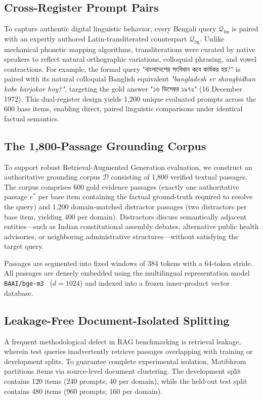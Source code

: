 \subsection{Cross-Register Prompt Pairs}
To capture authentic digital linguistic behavior, every Bengali query $\mathcal{Q}_{\text{bn}}$ is paired with an expertly authored Latin-transliterated counterpart $\mathcal{Q}_{\text{bg}}$. Unlike mechanical phonetic mapping algorithms, transliterations were curated by native speakers to reflect natural orthographic variations, colloquial phrasing, and vowel contractions. For example, the formal query \foreignlanguage{bengali}{"বাংলাদেশের সংবিধান কবে কার্যকর হয়?"} is paired with its natural colloquial Banglish equivalent \emph{"bangladesh er shongbidhan kobe karjokor hoy?"}, targeting the gold answer \foreignlanguage{bengali}{"১৬ ডিসেম্বর ১৯৭২"} (16 December 1972). This dual-register design yields 1,200 unique evaluated prompts across the 600 base items, enabling direct, paired linguistic comparisons under identical factual semantics.

\subsection{The 1,800-Passage Grounding Corpus}
To support robust Retrieval-Augmented Generation evaluation, we construct an authoritative grounding corpus $\mathcal{D}$ consisting of 1,800 verified textual passages. The corpus comprises 600 gold evidence passages (exactly one authoritative passage $e^*$ per base item containing the factual ground-truth required to resolve the query) and 1,200 domain-matched distractor passages (two distractors per base item, yielding 400 per domain). Distractors discuss semantically adjacent entities---such as Indian constitutional assembly debates, alternative public health advisories, or neighboring administrative structures---without satisfying the target query.

Passages are segmented into fixed windows of 384 tokens with a 64-token stride. All passages are densely embedded using the multilingual representation model \texttt{BAAI/bge-m3}~\citep{chen2024bge} ($d = 1024$) and indexed into a frozen inner-product vector database.

\subsection{Leakage-Free Document-Isolated Splitting}
A frequent methodological defect in RAG benchmarking is retrieval leakage, wherein test queries inadvertently retrieve passages overlapping with training or development splits. To guarantee complete experimental isolation, Matibhrom partitions items via source-level document clustering. The development split contains 120 items (240 prompts; 40 per domain), while the held-out test split contains 480 items (960 prompts; 160 per domain). 

